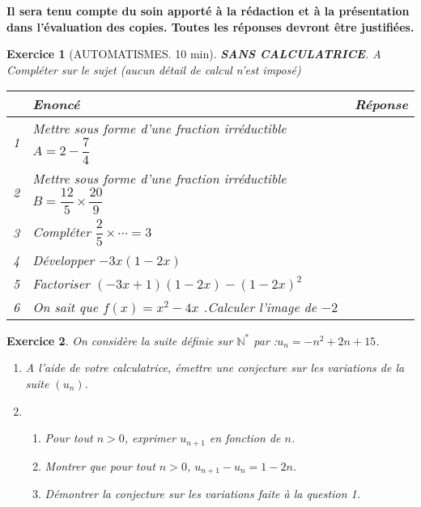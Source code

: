 \documentclass[10pt,a4paper]{article}
\def\N{{\mathbb N}}
\renewcommand{\arraystretch}{1}
\theoremstyle{break}
\newtheorem{exo}{Exercice}
\begin{document}
	\textbf{Il sera tenu compte du soin apporté à la rédaction et à la présentation dans l'évaluation des copies.
		Toutes les réponses devront être justifiées.}
\begin{exo}[AUTOMATISMES. 10 min] 
\textbf{SANS CALCULATRICE}. A Compléter sur le sujet (aucun détail de calcul n'est imposé)\\
{\renewcommand{\arraystretch}{2}
\begin{tabular}{|p{1cm}|p{10cm}|p{5.5cm}| }
	\hline
&Enoncé&Réponse\\
\hline
1&Mettre sous forme d'une fraction irréductible $A= 2-\dfrac74$&\\
\hline
2&Mettre sous forme d'une fraction irréductible $B= \dfrac{12}5\times\dfrac{20}9$&\\
\hline
3&Compléter $\dfrac25\times \cdots=3$&\\
\hline
4&Développer $-3x(1-2x)$&\\
\hline
5&Factoriser $(-3x+1)(1-2x)-(1-2x)^2$&\\
\hline
6&On sait que $f(x)=x^2-4x$ .Calculer l'image de $-2$&\\
\hline
\end{tabular}}

\end{exo}
\begin{exo}
	On considère la suite définie sur $\N^*$ par  :$u_n= -n^2+2n+15$.
	\begin{enumerate}
	\item A l'aide de votre calculatrice, émettre une conjecture sur les variations de la suite $(u_n)$.
	\item 
	\begin{enumerate}
		\item Pour tout $n>0$, exprimer $u_{n+1}$ en fonction de $n$.  
		\item Montrer que pour tout $n>0$,  $u_{n+1}-u_n=1-2n$. 
		\item Démontrer la conjecture sur les variations faite à la question 1.
	\end{enumerate}
	\end{enumerate}
\end{exo}
\end{document}
